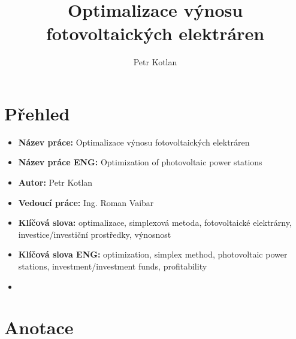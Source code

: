 \documentclass[a4paper, 12pt]{article}
\author{Petr Kotlan}
\title{Optimalizace výnosu fotovoltaických elektráren}
\date{}
\begin{document}
\maketitle
\tableofcontents

\pagebreak


\section{Přehled}

\begin{itemize}
    \item \textbf{Název práce:} Optimalizace výnosu fotovoltaických elektráren
    \item \textbf{Název práce ENG:} Optimization of photovoltaic power stations
    \item \textbf{Autor:} Petr Kotlan
    \item \textbf{Vedoucí práce:} Ing. Roman Vaibar
    \item \textbf{Klíčová slova:} optimalizace, simplexová metoda, fotovoltaické elektrárny, investice/investiční prostředky, výnosnost
    \item \textbf{Klíčová slova ENG:} optimization, simplex method, photovoltaic power stations, investment/investment funds, profitability
    \item

\end{itemize}


\section{Anotace}
\end{document}
